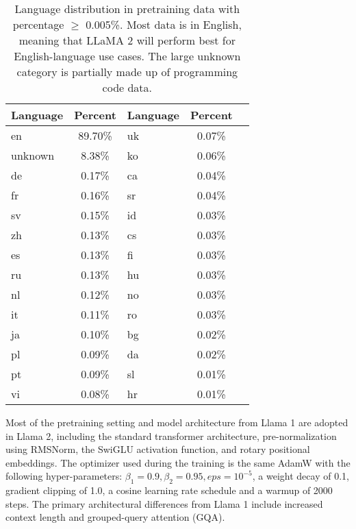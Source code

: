 \begin{table}[h!]
	\centering
	\begin{tabularx}{\textwidth}{XclcX}
		\hline
		\textbf{Language} & \textbf{Percent} & \textbf{Language} & \textbf{Percent} \\
		\hline
		en                & 89.70\%          & uk                & 0.07\%           \\
		unknown           & 8.38\%           & ko                & 0.06\%           \\
		de                & 0.17\%           & ca                & 0.04\%           \\
		fr                & 0.16\%           & sr                & 0.04\%           \\
		sv                & 0.15\%           & id                & 0.03\%           \\
		zh                & 0.13\%           & cs                & 0.03\%           \\
		es                & 0.13\%           & fi                & 0.03\%           \\
		ru                & 0.13\%           & hu                & 0.03\%           \\
		nl                & 0.12\%           & no                & 0.03\%           \\
		it                & 0.11\%           & ro                & 0.03\%           \\
		ja                & 0.10\%           & bg                & 0.02\%           \\
		pl                & 0.09\%           & da                & 0.02\%           \\
		pt                & 0.09\%           & sl                & 0.01\%           \\
		vi                & 0.08\%           & hr                & 0.01\%           \\
		\hline
	\end{tabularx}
	\caption{Language distribution in pretraining data with percentage $\geq$ 0.005\%. Most data is in English, meaning that LLaMA 2 will perform best for English-language use cases. The large unknown category is partially made up of programming code data.}
	\label{tab:llama2-pretraining-data}
\end{table}

Most of the pretraining setting and model architecture from Llama 1 are adopted in Llama 2, including the standard transformer architecture, pre-normalization using RMSNorm, the SwiGLU activation function, and rotary positional embeddings.
The optimizer used during the training is the same AdamW with the following hyper-parameters: $\beta_1=0.9, \beta_2=0.95, eps=10^{-5}$, a weight decay of 0.1, gradient clipping of 1.0, a cosine learning rate schedule and a warmup of 2000 steps.
The primary architectural differences from Llama 1 include increased context length and grouped-query attention (GQA).

